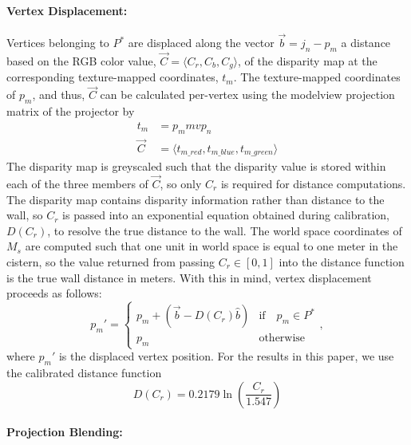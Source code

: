 \documentclass{llncs}
\begin{document}
\paragraph{\textbf{Vertex Displacement:}}
Vertices belonging to $P^{*}$ are displaced along the vector $\vec{b} = j_{n} - p_{m}$ a distance based on the RGB color value, $\vec{C} = \langle C_{r}, C_{b}, C_{g} \rangle$, of the disparity map at the corresponding texture-mapped coordinates, $t_m$. The texture-mapped coordinates of $p_m$, and thus, $\vec{C}$ can be calculated per-vertex using the modelview projection matrix of the projector by
\begin{align}
t_{m} &= p_{m} mvp_{n} \\
\vec{C} &= \langle t_{m\_red}, t_{m\_blue}, t_{m\_green} \rangle
\end{align}
The disparity map is greyscaled such that the disparity value is stored within each of the three members of $\vec{C}$, so only $C_r$ is required for distance computations. The disparity map contains disparity information rather than distance to the wall, so $C_r$ is passed into an exponential equation obtained during calibration, $D(C_r)$, to resolve the true distance to the wall. The world space coordinates of $M_s$ are computed such that one unit in world space is equal to one meter in the cistern, so the value returned from passing $C_r \in [0, 1]$ into the distance function is the true wall distance in meters. With this in mind, vertex displacement proceeds as follows:
\begin{equation}
p_{m}' = \left \{ 
\begin{array}{ll}
p_{m} + (\vec{b} - D(C_r)\hat{b})  & \text{if} \quad p_{m} \in P^{*}\\
p_{m} & \text{otherwise}
\end{array},\right.
\label{eq:displace}
\end{equation}
where $p_{m}'$ is the displaced vertex position. For the results in this paper, we use the calibrated distance function
\begin{equation}
D(C_r) = 0.2179\ln{\left(\frac{C_r}{1.547}\right)}
\label{eq:calibration}
\end{equation}
 \paragraph{\textbf{Projection Blending:}}
\end{document}
